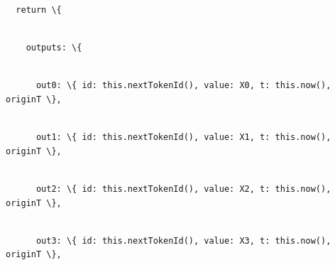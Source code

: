 \documentclass[
]{article}
\newcommand{\passthrough}[1]{#1}
\begin{document}
\strut \\
\passthrough{\lstinline!  !}\passthrough{\lstinline!return!}\passthrough{\lstinline! !}\passthrough{\lstinline!\{!}\strut \\
\passthrough{\lstinline!    !}\passthrough{\lstinline!outputs:!}\passthrough{\lstinline! !}\passthrough{\lstinline!\{!}\strut \\
\passthrough{\lstinline!      !}\passthrough{\lstinline!out0:!}\passthrough{\lstinline! !}\passthrough{\lstinline!\{!}\passthrough{\lstinline! !}\passthrough{\lstinline!id:!}\passthrough{\lstinline! !}\passthrough{\lstinline!this.nextTokenId!}\passthrough{\lstinline!(),!}\passthrough{\lstinline! !}\passthrough{\lstinline!value:!}\passthrough{\lstinline! !}\passthrough{\lstinline!X0,!}\passthrough{\lstinline! !}\passthrough{\lstinline!t:!}\passthrough{\lstinline! !}\passthrough{\lstinline!this.now!}\passthrough{\lstinline!(),!}\passthrough{\lstinline! !}\passthrough{\lstinline!originT!}\passthrough{\lstinline! !}\passthrough{\lstinline!\},!}\strut \\
\passthrough{\lstinline!      !}\passthrough{\lstinline!out1:!}\passthrough{\lstinline! !}\passthrough{\lstinline!\{!}\passthrough{\lstinline! !}\passthrough{\lstinline!id:!}\passthrough{\lstinline! !}\passthrough{\lstinline!this.nextTokenId!}\passthrough{\lstinline!(),!}\passthrough{\lstinline! !}\passthrough{\lstinline!value:!}\passthrough{\lstinline! !}\passthrough{\lstinline!X1,!}\passthrough{\lstinline! !}\passthrough{\lstinline!t:!}\passthrough{\lstinline! !}\passthrough{\lstinline!this.now!}\passthrough{\lstinline!(),!}\passthrough{\lstinline! !}\passthrough{\lstinline!originT!}\passthrough{\lstinline! !}\passthrough{\lstinline!\},!}\strut \\
\passthrough{\lstinline!      !}\passthrough{\lstinline!out2:!}\passthrough{\lstinline! !}\passthrough{\lstinline!\{!}\passthrough{\lstinline! !}\passthrough{\lstinline!id:!}\passthrough{\lstinline! !}\passthrough{\lstinline!this.nextTokenId!}\passthrough{\lstinline!(),!}\passthrough{\lstinline! !}\passthrough{\lstinline!value:!}\passthrough{\lstinline! !}\passthrough{\lstinline!X2,!}\passthrough{\lstinline! !}\passthrough{\lstinline!t:!}\passthrough{\lstinline! !}\passthrough{\lstinline!this.now!}\passthrough{\lstinline!(),!}\passthrough{\lstinline! !}\passthrough{\lstinline!originT!}\passthrough{\lstinline! !}\passthrough{\lstinline!\},!}\strut \\
\passthrough{\lstinline!      !}\passthrough{\lstinline!out3:!}\passthrough{\lstinline! !}\passthrough{\lstinline!\{!}\passthrough{\lstinline! !}\passthrough{\lstinline!id:!}\passthrough{\lstinline! !}\passthrough{\lstinline!this.nextTokenId!}\passthrough{\lstinline!(),!}\passthrough{\lstinline! !}\passthrough{\lstinline!value:!}\passthrough{\lstinline! !}\passthrough{\lstinline!X3,!}\passthrough{\lstinline! !}\passthrough{\lstinline!t:!}\passthrough{\lstinline! !}\passthrough{\lstinline!this.now!}\passthrough{\lstinline!(),!}\passthrough{\lstinline! !}\passthrough{\lstinline!originT!}\passthrough{\lstinline! !}\passthrough{\lstinline!\},!}\strut \\
\end{document}
